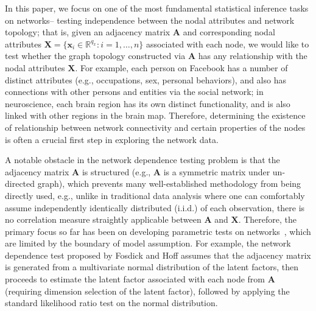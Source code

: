 \documentclass[12pt]{article}
\theoremstyle{definition}
\begin{document}
	In this paper, we focus on one of the most fundamental statistical inference tasks on networks-- testing independence between the nodal attributes and network topology; that is, given an adjacency matrix $\mathbf{A}$ and corresponding nodal attributes $\mathbf{X} = \{  \mathbf{x}_{i} \in \mathbb{R}^{q_{x}} : i = 1, \ldots, n \}$ associated with each node, we would like to test whether the graph topology constructed via $\mathbf{A}$ has any relationship with the nodal attributes $\mathbf{X}$. For example, each person on Facebook has a number of distinct attributes (e.g., occupations, sex, personal behaviors), and also has connections with other persons and entities via the social network; in neuroscience, each brain region has its own distinct functionality, and is also linked with other regions in the brain map. Therefore, determining the existence of relationship between network connectivity and certain properties of the nodes is often a crucial first step in exploring the network data. 
	
	A notable obstacle in the network dependence testing problem is that the adjacency matrix $\mathbf{A}$ is structured (e.g., $\mathbf{A}$ is a symmetric matrix under un-directed graph), which prevents many well-established methodology from being directly used, e.g., unlike in traditional data analysis where one can comfortably assume independently identically distributed (i.i.d.) of each observation, there is no correlation measure straightly applicable between $\mathbf{A}$ and $\mathbf{X}$. Therefore, the primary focus so far has been on developing parametric tests on networks~\citep{wasserman1996logit, fosdick2015testing, howard2016understanding}, which are limited by the boundary of model assumption. For example, the network dependence test proposed by Fosdick and Hoff \citep{fosdick2015testing} assumes that the adjacency matrix is generated from a multivariate normal distribution of the latent factors, then proceeds to estimate the latent factor associated with each node from $\mathbf{A}$ (requiring dimension selection of the latent factor), followed by applying the standard likelihood ratio test on the normal distribution.
	
\end{document}
